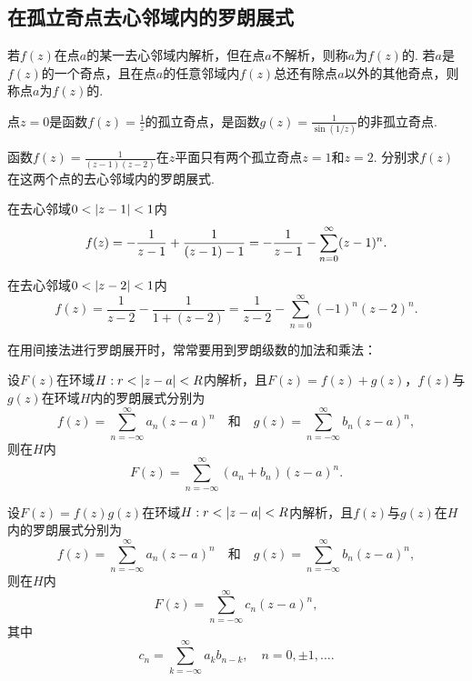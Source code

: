 \subsection{在孤立奇点去心邻域内的罗朗展式}
\begin{definition}
若\(f(z)\)在点\(a\)的某一去心邻域内解析，但在点\(a\)不解析，则称\(a\)为\(f(z)\)的.
若\(a\)是\(f(z)\)的一个奇点，且在点\(a\)的任意邻域内\(f(z)\)总还有除点\(a\)以外的其他奇点，则称点\(a\)为\(f(z)\)的.
\end{definition}

\begin{example}
点\(z=0\)是函数\(f(z) = \frac{1}{z}\)的孤立奇点，是函数\(g(z) = \frac{1}{\sin(1/z)}\)的非孤立奇点.
\end{example}

\begin{example}
函数\(f(z) = \frac{1}{(z-1)(z-2)}\)在\(z\)平面只有两个孤立奇点\(z=1\)和\(z=2\).
分别求\(f(z)\)在这两个点的去心邻域内的罗朗展式.
\begin{solution}
在去心邻域\(0<\abs{z-1}<1\)内\[
f(z) = -\frac{1}{z-1} + \frac{1}{(z-1)-1} \\
= -\frac{1}{z-1} - \sum\limits_{n=0}^{\infty} (z-1)^n.
\]

在去心邻域\(0<\abs{z-2}<1\)内\[
f(z) = \frac{1}{z-2} - \frac{1}{1+(z-2)}
= \frac{1}{z-2} - \sum\limits_{n=0}^{\infty} (-1)^n (z-2)^n.
\]
\end{solution}
\end{example}

在用间接法进行罗朗展开时，常常要用到罗朗级数的加法和乘法：
\begin{theorem}[罗朗级数的加法]
设\(F(z)\)在环域\(H: r < \abs{z-a} < R\)内解析，且\(F(z) = f(z) + g(z)\)，\(f(z)\)与\(g(z)\)在环域\(H\)内的罗朗展式分别为\[
f(z) = \sum\limits_{n=-\infty}^{\infty} a_n (z-a)^n
\quad\text{和}\quad
g(z) = \sum\limits_{n=-\infty}^{\infty} b_n (z-a)^n,
\]则在\(H\)内\[
F(z) = \sum\limits_{n=-\infty}^{\infty} (a_n+b_n) (z-a)^n.
\]
\end{theorem}

\begin{theorem}[罗朗级数的乘法]
设\(F(z) = f(z) g(z)\)在环域\(H: r < \abs{z-a} < R\)内解析，且\(f(z)\)与\(g(z)\)在\(H\)内的罗朗展式分别为\[
f(z) = \sum\limits_{n=-\infty}^{\infty} a_n (z-a)^n
\quad\text{和}\quad
g(z) = \sum\limits_{n=-\infty}^{\infty} b_n (z-a)^n,
\]则在\(H\)内\[
F(z) = \sum\limits_{n=-\infty}^{\infty} c_n (z-a)^n,
\]其中\[
c_n = \sum\limits_{k=-\infty}^{\infty} a_k b_{n-k},
\quad n=0,\pm1,\dotsc.
\]
\end{theorem}

